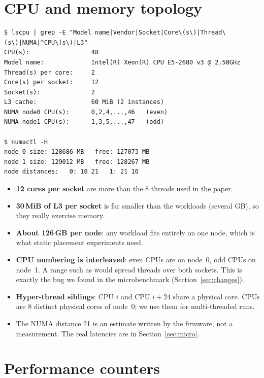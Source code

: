 \documentclass[11pt,a4paper]{article}
\newcommand{\id}[1]{\path{#1}}
\begin{document}
\section{CPU and memory topology}

\begin{Verbatim}
$ lscpu | grep -E "Model name|Vendor|Socket|Core\(s\)|Thread\(s\)|NUMA|^CPU\(s\)|L3"
CPU(s):                 48
Model name:             Intel(R) Xeon(R) CPU E5-2680 v3 @ 2.50GHz
Thread(s) per core:     2
Core(s) per socket:     12
Socket(s):              2
L3 cache:               60 MiB (2 instances)
NUMA node0 CPU(s):      0,2,4,...,46   (even)
NUMA node1 CPU(s):      1,3,5,...,47   (odd)

$ numactl -H
node 0 size: 128686 MB   free: 127073 MB
node 1 size: 129012 MB   free: 128267 MB
node distances:   0: 10 21   1: 21 10
\end{Verbatim}

\begin{itemize}
  \item \textbf{12 cores per socket} are more than the 8 threads used in the paper.
  \item \textbf{30\,MiB of L3 per socket} is far smaller than the workloads
        (several GB), so they really exercise memory.
  \item \textbf{About 126\,GB per node}: any workload fits entirely on one node,
        which is what static placement experiments need.
  \item \textbf{CPU numbering is interleaved}: even CPUs are on node~0, odd CPUs
        on node~1. A range such as \id{0-11} would spread threads over both
        sockets. This is exactly the bug we found in the microbenchmark
        (Section~\ref{sec:changes}).
  \item \textbf{Hyper-thread siblings}: CPU $i$ and CPU $i+24$ share a physical
        core. CPUs \id{0,2,4,6,8,10,12,14} are 8 distinct physical cores of
        node~0; we use them for multi-threaded runs.
  \item The NUMA distance 21 is an estimate written by the firmware, not a
        measurement. The real latencies are in Section~\ref{sec:micro}.
\end{itemize}

\section{Performance counters}
\label{sec:counters}
\end{document}
